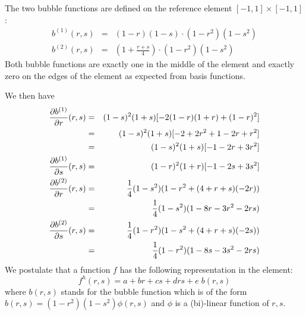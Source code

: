 
The two bubble functions are defined on the reference element $[-1,1]\times [-1,1]$:
\begin{eqnarray}
b^{(1)}(r,s) &=&  (1-r)(1-s)\cdot (1-r^2) (1-s^2) \\  
b^{(2)}(r,s) &=&  \left(1+\frac{r+s}{4}\right) \cdot (1-r^2) (1-s^2) 
\end{eqnarray}
Both bubble functions are exactly one in the middle of the element and exactly zero on the edges
of the element as expected from basis functions.


We then have
\begin{eqnarray}
\frac{\partial b^{(1)}}{\partial r}(r,s) 
&=& (1-s)^2(1+s)[-2(1-r)(1+r)+(1-r)^2]\nonumber\\
&=& (1-s)^2(1+s)[-2+2r^2 + 1-2r+r^2]\nonumber\\
&=& (1-s)^2(1+s)[-1-2r+3r^2]\\
\frac{\partial b^{(1)}}{\partial s}(r,s) 
&=& (1-r)^2(1+r)[-1-2s+3s^2 ] \\
\frac{\partial b^{(2)}}{\partial r}(r,s) 
&=& \frac{1}{4} (1-s^2) (1-r^2 + (4+r+s) (-2r)) \nonumber\\
&=& \frac{1}{4} (1-s^2) (1-8r-3r^2 -2rs) \\
\frac{\partial b^{(2)}}{\partial s}(r,s) 
&=& \frac{1}{4} (1-r^2) (1-s^2 + (4+r+s) (-2s)) \nonumber\\
&=& \frac{1}{4} (1-r^2) (1-8s-3s^2 -2rs) 
\end{eqnarray}
We postulate that a function $f$ has the following representation 
in the element:
\[
f^h(r,s)=a+br+cs+drs+e \; b(r,s) 
\]
where $b(r,s)$ stands for the bubble function which is of the form $b(r,s)=(1-r^2)(1-s^2)\phi(r,s)$
and $\phi$ is a (bi)-linear function of $r,s$.

